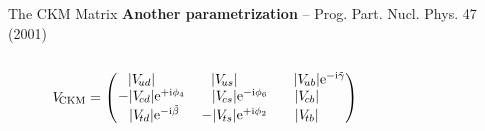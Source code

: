 \begin{frame}{The CKM Matrix}
    \textbf{Another parametrization}
    -- {\footnotesize Prog. Part. Nucl. Phys. 47 (2001)}
    \begin{columns}
        \begin{column}{.7\textwidth}
            \begin{equation*}
                V_\text{\!CKM} = \begin{pmatrix}
                \phantom{-}|V_{\!ud}|\phantom{\mathrm{e}^{-\mathrm{i}\phi_6}} &
                \phantom{-}|V_{\!us}|\phantom{\mathrm{e}^{-\mathrm{i}\phi_6}} &
                \phantom{-}|V_{\!ub}| \mathrm{e}^{-\mathrm{i}\tilde\gamma}\\
                -|V_{\!cd}| \mathrm{e}^{+\mathrm{i}\phi_4} &
                \phantom{-}|V_{\!cs}| \mathrm{e}^{-\mathrm{i}\phi_6} &
                \phantom{-}|V_{\!cb}|\phantom{\mathrm{e}^{-\mathrm{i}\tilde\gamma}} \\
                \phantom{-}|V_{\!td}| \mathrm{e}^{-\mathrm{i}\tilde\beta\phantom{{}_4}} &
                -|V_{\!ts}| \mathrm{e}^{+\mathrm{i}\phi_2} &
                \phantom{-}|V_{\!tb}|\phantom{\mathrm{e}^{-\mathrm{i}\tilde\gamma}}
                \end{pmatrix}
            \end{equation*}
        \end{column}
        \begin{column}{.3\textwidth}
        \end{column}
    \end{columns}
    \vfill
    \begin{columns}[T]
        \begin{column}{.6\textwidth}
            \begin{itemize}

\end{itemize}
\end{column}
\end{columns}
\end{frame}
